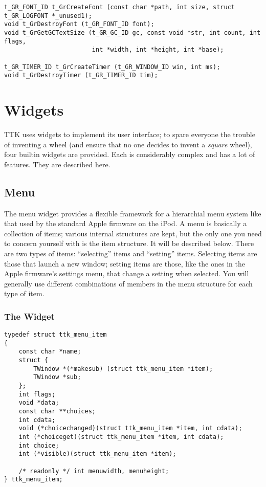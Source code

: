 \documentclass[12pt,letterpaper]{report}
\begin{document}
{\begin{verbatim}
t_GR_FONT_ID t_GrCreateFont (const char *path, int size, struct t_GR_LOGFONT *_unused1);
void t_GrDestroyFont (t_GR_FONT_ID font);
void t_GrGetGCTextSize (t_GR_GC_ID gc, const void *str, int count, int flags,
                        int *width, int *height, int *base);

t_GR_TIMER_ID t_GrCreateTimer (t_GR_WINDOW_ID win, int ms);
void t_GrDestroyTimer (t_GR_TIMER_ID tim);
\end{verbatim}
}

\chapter{Widgets}
TTK uses widgets to implement its user interface; to spare everyone the trouble of inventing
a wheel (and ensure that no one decides to invent a \emph{square} wheel), four builtin widgets
are provided. Each is considerably complex and has a lot of features. They are described here.

\section{Menu}


The menu widget provides a flexible framework for a hierarchial menu system like that used by
the standard Apple firmware on the iPod. A menu is basically a collection of items; various
internal structures are kept, but the only one you need to concern yourself with is the
item structure. It will be described below. There are two types of items: ``selecting'' items
and ``setting'' items. Selecting items are those that launch a new window; setting items
are those, like the ones in the Apple firmware's settings menu, that change a setting
when selected. You will generally use different combinations of members in the menu structure
for each type of item.

\subsection{The Widget}

\begin{verbatim}
typedef struct ttk_menu_item 
{
    const char *name;
    struct {
        TWindow *(*makesub) (struct ttk_menu_item *item);
        TWindow *sub;
    };
    int flags;
    void *data;
    const char **choices;
    int cdata;
    void (*choicechanged)(struct ttk_menu_item *item, int cdata);
    int (*choiceget)(struct ttk_menu_item *item, int cdata);
    int choice;
    int (*visible)(struct ttk_menu_item *item);

    /* readonly */ int menuwidth, menuheight;
} ttk_menu_item;
\end{verbatim}
\end{document}
